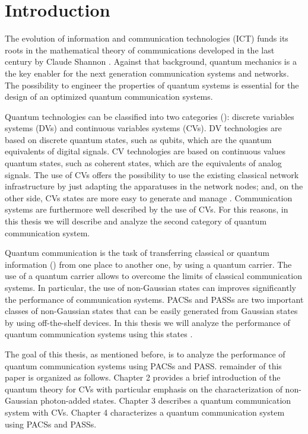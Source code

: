 \chapter{Introduction}
    The evolution of information and communication technologies (ICT) funds its roots in the mathematical
    theory of communications developed in the last century by Claude Shannon \cite{shannon}.
    Against that background, quantum mechanics is a the key enabler for the next generation 
    communication systems and networks.
    The possibility to engineer the properties of quantum systems is essential for the design
    of an optimized quantum communication systems.
    
    Quantum technologies can be classified into two categories (\cite{tesiGuerrini}): discrete 
    variables systems (DVs) and continuous variables systems (CVs). DV technologies are based
    on discrete quantum states, such as qubits, which are the quantum equivalents of digital
    signals. CV technologies are based on continuous values quantum states, such as 
    coherent states, which are the equivalents of analog signals.
    The use of CVs offers the possibility to use the existing classical network
    infrastructure by just adapting the apparatuses in the network nodes; and, on the other
    side, CVs states are more easy to generate and manage \cite{tesiGuerrini}. Communication
    systems are furthermore well described by the use of CVs. 
    For this reasons, in this thesis we will describe and analyze the second category of quantum
    communication system.

    Quantum communication is the task of transferring classical or quantum information
    (\cite{GueChiWinCon:C20,GueChiWinCon:C19,GueChiCon:C18,ChiConWin:J20}) from one place to another
    one, by using a quantum carrier.
    The use of a quantum carrier allows to overcome the 
    limits of classical communication systems.
    In particular, the use of non-Gaussian states
    can improves significantly the performance of communication systems. 
    PACSs and PASSs are two important classes of non-Gaussian states that can be easily generated 
    from Gaussian states by using off-the-shelf devices. In this thesis we will analyze the 
    performance of quantum communication systems using this states 
    \cite{PACSDisc,GueChiWinCon:C20,GueChiWinCon:C19,GueChiCon:C18}.

    The goal of this thesis, as mentioned before, is to analyze the performance of quantum 
    communication systems using PACSs and PASS. remainder of this paper is organized as follows. 
    Chapter 2 provides a brief introduction of the quantum theory for CVs with particular emphasis on
    the characterization of non-Gaussian photon-added states. Chapter 3 describes a quantum communication 
    system with CVs. Chapter 4 characterizes a quantum communication system using PACSs and PASSs.
